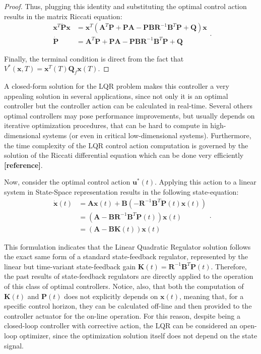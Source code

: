 \documentclass[a4paper,11pt]{book}
\numberwithin{figure}{chapter}
\numberwithin{equation}{chapter}
\numberwithin{table}{chapter}
\theoremstyle{definition}
\begin{document}
\begin{proof}
    Thus, plugging this identity and substituting the optimal control action results in the matrix Riccati equation:
    \begin{equation}
    \begin{split}
    \bm{x}^T \dot{\bm{P}} \bm{x} &= \bm{x}^T (\bm{A}^T \bm{P} + \bm{P} \bm{A} - \bm{P} \bm{B} \bm{R}^{-1} \bm{B}^T \bm{P} + \bm{Q}) \bm{x} \\
    \dot{\bm{P}} &= \bm{A}^T \bm{P} + \bm{P} \bm{A} - \bm{P} \bm{B} \bm{R}^{-1} \bm{B}^T \bm{P} + \bm{Q}
    \end{split}
    .\end{equation}
    
    Finally, the terminal condition is direct from the fact that $V^*(\bm{x}, T) = \bm{x}^T(T) \bm{Q}_f \bm{x}(T)$.
\end{proof}

A closed-form solution for the LQR problem makes this controller a very appealing solution in several applications, since not only it is an optimal controller but the controller action can be calculated in real-time. Several others optimal controllers may pose performance improvements, but usually depends on iterative optimization procedures, that can be hard to compute in high-dimensional systems (or even in critical low-dimensional systems). Furthermore, the time complexity of the LQR control action computation is governed by the solution of the Riccati differential equation which can be done very efficiently \textbf{[reference]}.

Now, consider the optimal control action $\bm{u}^*(t)$. Applying this action to a linear system in State-Space representation results in the following state-equation:
\begin{equation}
\begin{split}
    \dot{\bm{x}}(t) &= \bm{A} \bm{x}(t) + \bm{B} \left( -\bm{R}^{-1} \bm{B}^T \bm{P}(t) \bm{x}(t) \right) \\
        & = \left( \bm{A} - \bm{B} \bm{R}^{-1} \bm{B}^T \bm{P}(t) \right) \bm{x}(t) \\
        & = \left( \bm{A} - \bm{B} \bm{K}(t) \right) \bm{x}(t)
\end{split}
.\end{equation}

This formulation indicates that the Linear Quadratic Regulator solution follows the exact same form of a standard state-feedback regulator, represented by the linear but time-variant state-feedback gain $\bm{K}(t) = \bm{R}^{-1} \bm{B}^T \bm{P}(t)$. Therefore, the past results of state-feedback regulators are directly applied to the operation of this class of optimal controllers. Notice, also, that both the computation of $\bm{K}(t)$ and $\bm{P}(t)$ does not explicitly depends on $\bm{x}(t)$, meaning that, for a specific control horizon, they can be calculated off-line and then provided to the controller actuator for the on-line operation. For this reason, despite being a closed-loop controller with corrective action, the LQR can be considered an open-loop optimizer, since the optimization solution itself does not depend on the state signal.
\end{document}
